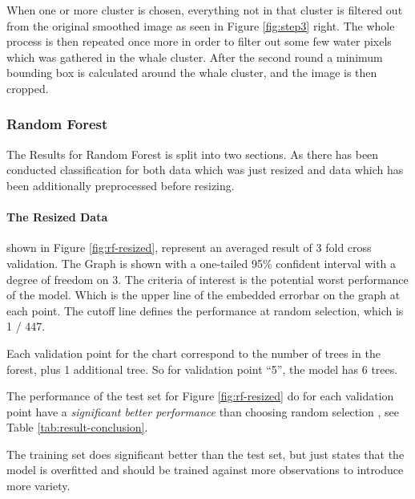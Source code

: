 When one or more cluster is chosen, everything not in that cluster is filtered out from the original smoothed image as seen in Figure \ref{fig:step3} right. The whole process is then repeated once more in order to filter out some few water pixels which was gathered in the whale cluster.
After the second round a minimum bounding box is calculated around the whale cluster, and the image is then cropped.



\subsubsection{Random Forest}
The Results for Random Forest is split into two sections. As there has been conducted classification for both data which was just resized and data which has been additionally preprocessed before resizing.

\paragraph{The Resized Data}
\label{par:rf-resized}
shown in Figure \ref{fig:rf-resized}, represent an averaged result of 3 fold cross validation. The Graph is shown with a one-tailed 95\% confident interval with a degree of freedom on 3. The criteria of interest is the potential worst performance of the model. Which is the upper line of the embedded errorbar on the graph at each point. The cutoff line defines the performance at random selection, which is 1 / 447. 

Each validation point for the chart correspond to the number of trees in the forest, plus 1 additional tree. So for validation point ``5'', the model has 6 trees.

The performance of the test set for Figure \ref{fig:rf-resized} do for each validation point have a \emph{significant better performance} than choosing random selection
, see Table \ref{tab:result-conclusion}.

The training set does significant better than the test set, but just states that the model is overfitted and should be trained against more observations to introduce more variety.


